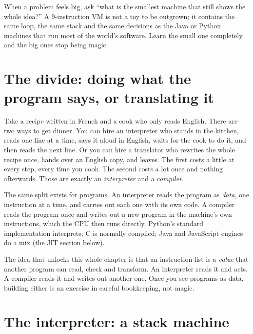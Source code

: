 \begin{principle}
When a problem feels big, ask ``what is the smallest machine that
still shows the whole idea?'' A 9-instruction VM is not a toy to be
outgrown; it contains the same loop, the same stack and the same
decisions as the Java or Python machines that run most of the
world's software. Learn the small one completely and the big ones stop
being magic.
\end{principle}

\section{The divide: doing what the program says, or translating it}

Take a recipe written in French and a cook who only reads English. There are
two ways to get dinner. You can hire an interpreter who stands in the
kitchen, reads one line at a time, says it aloud in English, waits for the
cook to do it, and then reads the next line. Or you can hire a translator
who rewrites the whole recipe once, hands over an English copy, and leaves.
The first costs a little at every step, every time you cook. The second costs
a lot once and nothing afterwards. Those are exactly an \emph{interpreter}
and a \emph{compiler}.

The same split exists for programs. An interpreter reads the program as
\emph{data}, one instruction at a time, and carries out each one with its own
code. A compiler reads the program once and writes out a new program in the
machine's own instructions, which the CPU then runs directly. Python's
standard implementation interprets; C is normally compiled; Java and
JavaScript engines do a mix (the JIT section below).


\begin{principle}
The idea that unlocks this whole chapter is that an instruction list is a
\emph{value} that another program can read, check and transform. An
interpreter reads it and acts. A compiler reads it and writes out
another one. Once you see programs as data, building either is an exercise in
careful bookkeeping, not magic.
\end{principle}

\section{The interpreter: a stack machine}

